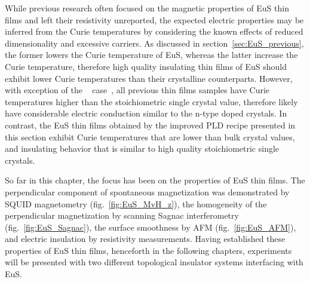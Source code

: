 While previous research often focused on the magnetic properties of EuS thin films and left their resistivity unreported, the expected electric properties may be inferred from the Curie temperatures by considering the known effects of reduced dimensionality and excessive carriers. As discussed in section~\ref{sec:EuS_previous}, the former lowers the Curie temperature of EuS, whereas the latter increase the Curie temperature, therefore high quality insulating thin films of EuS should exhibit lower Curie temperatures than their crystalline counterparts. However, with exception of the \citeauthor{EuS_MBE_Dauth}~\citeyear{EuS_MBE_Dauth} case~\cite{EuS_MBE_Dauth}, all previous thin films samples have Curie temperatures higher than the stoichiometric single crystal value, therefore likely have considerable electric conduction similar to the n-type doped crystals. In contrast, the EuS thin films obtained by the improved PLD recipe presented in this section exhibit Curie temperatures that are lower than bulk crystal values, and insulating behavior that is similar to high quality stoichiometric single crystals.

So far in this chapter, the focus has been on the properties of EuS thin films. The perpendicular component of spontaneous magnetization was demonstrated by SQUID magnetometry (fig.~\ref{fig:EuS_MvH_z}), the homogeneity of the perpendicular magnetization by scanning Sagnac interferometry (fig.~\ref{fig:EuS_Sagnac}), the surface smoothness by AFM (fig.~\ref{fig:EuS_AFM}), and electric insulation by resistivity measurements. Having established these properties of EuS thin films, henceforth in the following chapters, experiments will be presented with two different topological insulator systems interfacing with EuS.